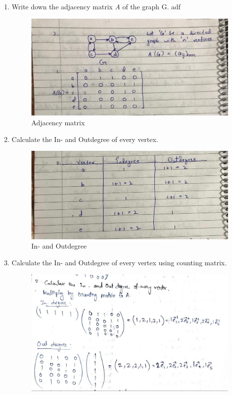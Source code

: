 \documentclass{resources/WeSTassignment}
\begin{document}
\begin{enumerate}
    \item Write down the adjacency matrix \emph{A} of the graph G. adf
    \begin{figure}[ht]
    \centering
    \includegraphics[scale=0.4]{./resources/2.1.jpeg}
    \caption{Adjacency matrix}
    \label{fig:Adjacency matrix}
\end{figure}
    \item Calculate the In- and Outdegree of every vertex.
    \begin{figure}[ht]
    \centering
    \includegraphics[scale=0.4]{./resources/2.2.jpeg}
    \caption{In- and Outdegree}
    \label{fig:In- and Outdegree}
\end{figure}
 \item Calculate the In- and Outdegree of every vertex using counting matrix.
    \begin{figure}[ht]
    \centering
    \includegraphics[scale=0.4]{./resources/in-out-degree.jpeg}

\end{figure}
\end{enumerate}
\end{document}
